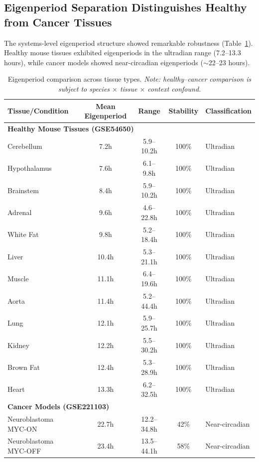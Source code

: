\documentclass[11pt,a4paper]{article}
\begin{document}
\subsection{Eigenperiod Separation Distinguishes Healthy from Cancer Tissues}

The systems-level eigenperiod structure showed remarkable robustness (Table~\ref{tab:eigenperiod}). Healthy mouse tissues exhibited eigenperiods in the ultradian range (7.2--13.3 hours), while cancer models showed near-circadian eigenperiods ($\sim$22--23 hours).

\begin{table}[H]
\centering
\caption{Eigenperiod comparison across tissue types. \textit{Note: healthy--cancer comparison is subject to species $\times$ tissue $\times$ context confound.}}
\label{tab:eigenperiod}
\begin{tabular}{lcccl}
\toprule
Tissue/Condition & Mean Eigenperiod & Range & Stability & Classification \\
\midrule
\multicolumn{5}{l}{\textbf{Healthy Mouse Tissues (GSE54650)}} \\
Cerebellum & 7.2h & 5.9--10.2h & 100\% & Ultradian \\
Hypothalamus & 7.6h & 6.1--9.8h & 100\% & Ultradian \\
Brainstem & 8.4h & 5.9--10.2h & 100\% & Ultradian \\
Adrenal & 9.6h & 4.6--22.8h & 100\% & Ultradian \\
White Fat & 9.8h & 5.2--18.4h & 100\% & Ultradian \\
Liver & 10.4h & 5.3--21.1h & 100\% & Ultradian \\
Muscle & 11.1h & 6.4--19.6h & 100\% & Ultradian \\
Aorta & 11.4h & 5.2--44.4h & 100\% & Ultradian \\
Lung & 12.1h & 5.9--25.7h & 100\% & Ultradian \\
Kidney & 12.2h & 5.5--30.2h & 100\% & Ultradian \\
Brown Fat & 12.4h & 5.3--28.9h & 100\% & Ultradian \\
Heart & 13.3h & 6.2--32.5h & 100\% & Ultradian \\
\midrule
\multicolumn{5}{l}{\textbf{Cancer Models (GSE221103)}} \\
Neuroblastoma MYC-ON & 22.7h & 12.2--34.8h & 42\% & Near-circadian \\
Neuroblastoma MYC-OFF & 23.4h & 13.5--44.1h & 58\% & Near-circadian \\
\bottomrule
\end{tabular}
\end{table}
\end{document}
